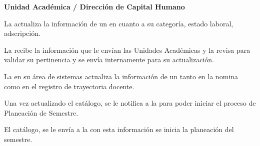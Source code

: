 \begin{PDescripcion}
	
	\Ppaso \textbf{Unidad Académica / Dirección de Capital Humano}
	
	\begin{enumerate}
		\Ppaso[\PSubProceso]  La  actualiza la información de un  en cuanto a su categoría, estado laboral, adscripción.
				
	\Ppaso[\PSubProceso]  La  recibe la información que le envían las Unidades Académicas y la revisa para validar su pertinencia y se envía internamente para su actualización.
	
	\Ppaso[\PSubProceso]  La  en su área de sistemas actualiza la información de un  tanto en la nomina como en el registro de trayectoria docente.  
	
	\Ppaso[\PSubProceso]  Una vez actualizado el catálogo, se le notifica a la  para poder iniciar el proceso de Planeación de Semestre.
	
	\Ppaso[\PSubProceso]  El catálogo, se le envía a la  con esta información se inicia la planeación del semestre.
	\end{enumerate}
\end{PDescripcion}